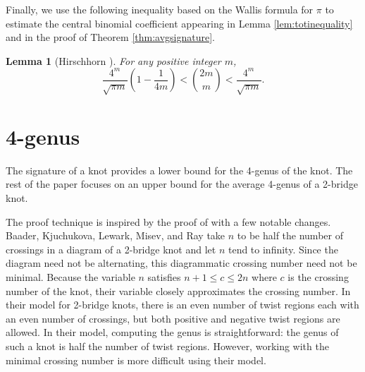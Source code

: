 \documentclass[12pt]{amsart}
\newtheorem{lemma}[theorem]{Lemma}
\theoremstyle{definition}
\theoremstyle{remark}
\numberwithin{equation}{section}
\begin{document}
Finally, we use the following inequality based on the Wallis formula for $\pi$ \cite{Wallis} to estimate the central binomial coefficient appearing in Lemma \ref{lem:totinequality} and in the proof of Theorem \ref{thm:avgsignature}. 

\begin{lemma}[Hirschhorn \cite{Hirschhorn}]
    \label{lem:Wallis}
    For any positive integer $m$,
    \[\frac{4^m}{\sqrt{\pi m}}\left(1-\frac{1}{4m}\right) < \binom{2m}{m} < \frac{4^m}{\sqrt{\pi m}}.\]
\end{lemma}


\section{4-genus}
\label{sec:4-genus}

The signature of a knot provides a lower bound for the 4-genus of the knot.  The rest of the paper focuses on an upper bound for the average 4-genus of a 2-bridge knot.

The proof technique is inspired by the proof of \cite[Lemma 2]{BKLMR} with a few notable changes.  Baader, Kjuchukova, Lewark, Misev, and Ray take $n$ to be half the number of crossings in a diagram of a 2-bridge knot and let $n$ tend to infinity.
Since the diagram need not be alternating, this diagrammatic crossing number need not be minimal. Because the variable $n$ satisfies $n+1\leq c\leq 2n$ where $c$ is the crossing number of the knot, their variable closely approximates the crossing number. In their model for 2-bridge knots, there is an even number of twist regions each with an even number of crossings, but both positive and negative twist regions are allowed. In their model, computing the genus is straightforward: the genus of such a knot is half the number of twist regions. However, working with the minimal crossing number is more difficult using their model.
\end{document}
